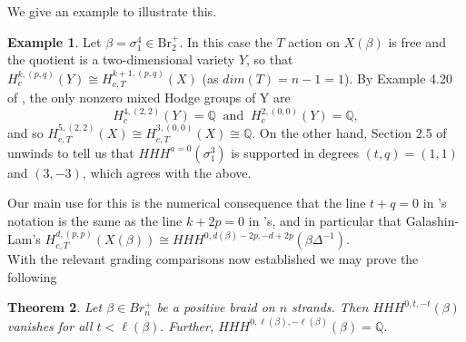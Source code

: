 \documentclass[11pt]{amsart}
\newtheorem{thm}{Theorem}[section]
\theoremstyle{definition}
\newtheorem{exmp}[thm]{Example}
\theoremstyle{remark}
\numberwithin{equation}{section}
\begin{document}
We give an example to illustrate this.

\begin{exmp}\label{ex:trefoil}
Let $\beta = \sigma_1^4 \in \mathrm{Br}^+_2$. In this case the $T$ action on $X(\beta)$ is free and the
quotient is a two-dimensional variety $Y$, so that $H^{k, (p, q)}_c(Y) \cong H^{k + 1, (p, q)}_{c, T}(X)$ (as $dim(T) = n - 1 = 1$). By Example 4.20 of \cite{MR4809331}, the only nonzero mixed Hodge groups of Y are
\begin{equation}
    H_c^{4,(2,2)}(Y) = \mathbb{Q}\;\;\text{and}\;\; H_c^{2,(0,0)}(Y) = \mathbb{Q},
\end{equation} and so $H^{5, (2, 2)}_{c, T}(X) \cong H^{3, (0, 0)}_{c, T}(X) \cong \mathbb{Q}$. On the other hand, Section 2.5 of \cite{li2025last} unwinds to tell us that $HHH^{a = 0}(\sigma_1^3)$ is supported in degrees $(t,q) = (1, 1)$ and $(3,-3)$, which agrees with the above.
\end{exmp}

Our main use for this is the numerical consequence that the line $t + q = 0$ in \cite{li2025last}'s notation is the same as the line $k + 2p = 0$ in \cite{MR4809331}'s, and in particular that Galashin-Lam's $H^{d, (p,p)}_{c, T}(X(\beta)) \cong HHH^{0, d(\beta) - 2p, -d + 2p}(\beta \Delta^{-1})$.\\

With the relevant grading comparisons now established we may prove the following

\begin{thm}\label{HHH vanishing}
Let $\beta \in Br_n^+$ be a positive braid on $n$ strands. Then $HHH^{0, t, -t}(\beta)$ vanishes for all $t < \ell(\beta).$ Further, $HHH^{0, \ell(\beta), -\ell(\beta)}(\beta) = \mathbb{Q}$.
\end{thm}
\end{document}
